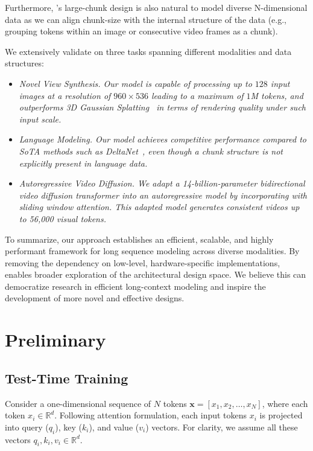 \documentclass{article}
\begin{document}
Furthermore, \methodname's large-chunk design is also natural to model diverse N-dimensional data as we can align chunk-size with the internal structure of the data (e.g., grouping tokens within an image or consecutive video frames as a chunk).

We extensively  validate \methodname{} on three tasks spanning different modalities and data structures: 
\begin{itemize}
\item \em{Novel View Synthesis}.
Our model is capable of processing up to $128$ input images 
at a resolution of $960\!\times\!536$ leading to a maximum of $1$M tokens, and  outperforms 3D Gaussian Splatting~\cite{kerbl20233d} in terms of rendering quality under such input scale.
\item \em{Language Modeling}.
Our model achieves competitive performance compared to SoTA methods such as DeltaNet~\cite{yang2024parallelizing}, even though a chunk structure is not explicitly present in language data.
\item \em{Autoregressive Video Diffusion}. 
We adapt a 14-billion-parameter bidirectional video diffusion transformer into an autoregressive model by incorporating \methodname{} with sliding window attention. This adapted model generates consistent videos up to 56,000 visual tokens.
\end{itemize}

To summarize, our approach establishes an efficient, scalable, and highly performant framework for long 
sequence modeling across diverse modalities. 
By removing the dependency on low-level, hardware-specific implementations, \methodname{} enables broader exploration of the architectural design space. We believe this can democratize research in efficient long-context modeling and inspire the development of more novel and effective designs.  

\section{Preliminary} \label{sec:related}

\subsection{Test-Time Training}

Consider a one-dimensional sequence of $N$ tokens
$\mathbf{x} = [x_1, x_2, \dots, x_N]$, where each token $x_i \in \mathbb{R}^d$. 
Following attention formulation, 
each input tokens $x_i$ is projected into query ($q_i$), key ($k_i$), and value ($v_i$) vectors. 
For clarity, we assume all these vectors $q_i, k_i, v_i \in \mathbb{R}^d$.
\end{document}
